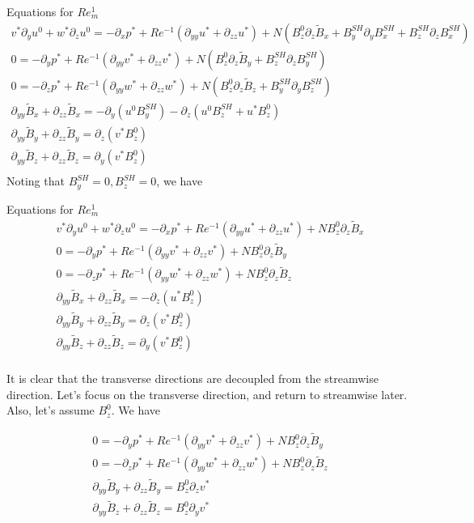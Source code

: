 \documentclass[11pt]{article}
\newcommand{\BS}{B^{SH}}
\newcommand{\BT}{\tilde{B}}
\newcommand{\PD}{\partial}
\begin{document}
Equations for $Re_m^1$
\begin{equation}\begin{aligned}
v^* \PD_y u^0 + w^* \PD_z u^0 = -\PD_x p^*+ Re^{-1} (\PD_{yy} u^* + \PD_{zz} u^*) + N ( B_z^0 \PD_z \BT_x + \BS_y \PD_y \BS_x + \BS_z \PD_z \BS_x ) \\
0 = -\PD_y p^*+ Re^{-1} (\PD_{yy} v^* + \PD_{zz} v^*) + N ( B_z^0 \PD_z \BT_y + \BS_z \PD_z \BS_y ) \\
0 = -\PD_z p^*+ Re^{-1} (\PD_{yy} w^* + \PD_{zz} w^*) + N ( B_z^0 \PD_z \BT_z + \BS_y \PD_y \BS_z) \\
\PD_{yy} \BT_x + \PD_{zz} \BT_x =-\PD_y ( u^0 \BS_y) - \PD_z ( u^0 \BS_z + u^* B_z^0) \\
\PD_{yy} \BT_y + \PD_{zz} \BT_y = \PD_z ( v^* B_z^0 ) \\
\PD_{yy} \BT_z + \PD_{zz} \BT_z = \PD_y ( v^* B_z^0 ) \\
\end{aligned}\end{equation}
Noting that $\BS_y = 0, \BS_z = 0$, we have

Equations for $Re_m^1$
\begin{equation}\begin{aligned}
v^* \PD_y u^0 + w^* \PD_z u^0 = -\PD_x p^*+ Re^{-1} (\PD_{yy} u^* + \PD_{zz} u^*) + N B_z^0 \PD_z \BT_x \\
0 = -\PD_y p^*+ Re^{-1} (\PD_{yy} v^* + \PD_{zz} v^*) + N B_z^0 \PD_z \BT_y \\
0 = -\PD_z p^*+ Re^{-1} (\PD_{yy} w^* + \PD_{zz} w^*) + N B_z^0 \PD_z \BT_z \\
\PD_{yy} \BT_x + \PD_{zz} \BT_x =-\PD_z ( u^* B_z^0 ) \\
\PD_{yy} \BT_y + \PD_{zz} \BT_y = \PD_z ( v^* B_z^0 ) \\
\PD_{yy} \BT_z + \PD_{zz} \BT_z = \PD_y ( v^* B_z^0 ) \\
\end{aligned}\end{equation}

It is clear that the transverse directions are decoupled from the streamwise direction. 
Let's focus on the transverse direction, and return to streamwise later. Also, let's assume $B_z^0$. We have

\begin{equation}\begin{aligned}
0 = -\PD_y p^*+ Re^{-1} (\PD_{yy} v^* + \PD_{zz} v^*) + N B_z^0 \PD_z \BT_y \\
0 = -\PD_z p^*+ Re^{-1} (\PD_{yy} w^* + \PD_{zz} w^*) + N B_z^0 \PD_z \BT_z \\
\PD_{yy} \BT_y + \PD_{zz} \BT_y = B_z^0 \PD_z v^* \\
\PD_{yy} \BT_z + \PD_{zz} \BT_z = B_z^0 \PD_y v^* \\
\end{aligned}\end{equation}
\end{document}
